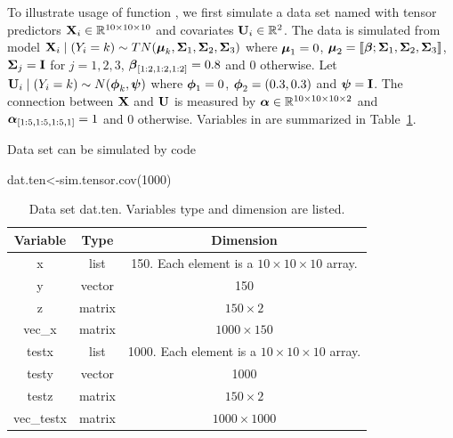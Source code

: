 
To illustrate usage of function , we first simulate a data set named  with tensor predictors $\mathbf{X}_i\in\mathbb{R}^{10\times 10\times 10}$ and covariates $\mathbf{U}_i\in\mathbb{R}^2$. The data is simulated from model $\mathbf{X}_i\mid (Y_i=k) \sim TN(\boldsymbol{\mu}_k,\boldsymbol{\Sigma}_1,\boldsymbol{\Sigma}_2,\boldsymbol{\Sigma}_3)$ where $\boldsymbol{\mu}_1=0$, $\boldsymbol{\mu}_2=\llbracket \boldsymbol{\beta};\boldsymbol{\Sigma}_1,\boldsymbol{\Sigma}_2,\boldsymbol{\Sigma}_3\rrbracket$, $\boldsymbol{\Sigma}_j=\mathbf{I}$ for $j=1,2,3$, $\boldsymbol{\beta}_{[1:2,1:2,1:2]}=0.8$ and 0 otherwise. 
Let $\mathbf{U}_i\mid (Y_i=k)\sim N(\boldsymbol{\phi}_k,\boldsymbol{\psi})$ where $\boldsymbol{\phi}_1=0$, $\boldsymbol{\phi}_2=(0.3, 0.3)$ and $\boldsymbol{\psi}=\mathbf{I}$. The connection between $\mathbf{X}$ and $\mathbf{U}$ is measured by $\boldsymbol{\alpha}\in\mathbb{R}^{10\times 10\times 10\times 2}$ and $\boldsymbol{\alpha}_{[1:5,1:5,1:5,1]}=1$ and 0 otherwise. Variables in  are summarized in Table~\ref{tab:datten}.

Data set  can be simulated by code
\begin{example}
dat.ten<-sim.tensor.cov(1000)
\end{example}



\begin{table}[!t]
 \centering
 \begin{tabular}{ccc}
  \toprule
  Variable&Type&Dimension\\
  \midrule
  x&list&150. Each element is a $10\times10\times 10$ array.\\
  y&vector&150\\
  z&matrix&$150\times 2$\\
  vec\_x&matrix&$1000\times 150$\\
  testx&list&1000. Each element is a $10\times10\times 10$ array.\\
  testy&vector&1000\\
  testz&matrix&$150\times 2$\\
  vec\_testx&matrix&$1000\times 1000$\\
  \bottomrule
 \end{tabular}
 \caption{Data set dat.ten. Variables type and dimension are listed.}
 \label{tab:datten}
\end{table}

